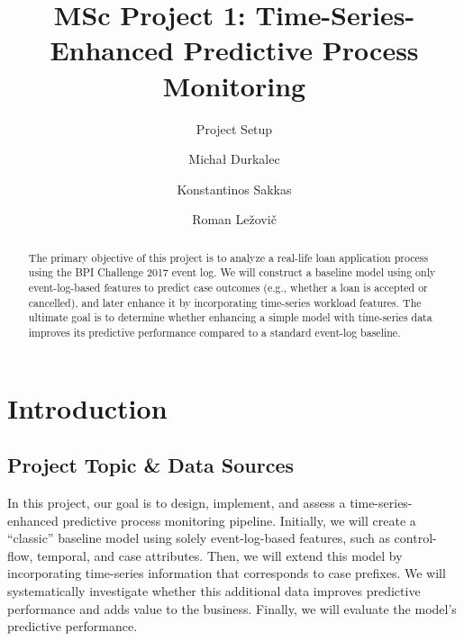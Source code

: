 \documentclass[runningheads]{llncs}
\begin{document}
%
\title{MSc Project 1: Time-Series-Enhanced Predictive Process Monitoring}
\subtitle{Project Setup}
%
%
\author{Michał Durkalec\and
    Konstantinos Sakkas \and
    Roman Ležovič}

%
%
%
\maketitle  %
%
\begin{abstract}
    The primary objective of this project is to analyze a real-life loan application process using the BPI Challenge 2017 event log. We will construct a baseline model using only event-log-based features to predict case outcomes (e.g., whether a loan is accepted or cancelled), and later enhance it by incorporating time-series workload features. The ultimate goal is to determine whether enhancing a simple model with time-series data improves its predictive performance compared to a standard event-log baseline.

\end{abstract}
%
%
%
\section{Introduction}

\subsection{Project Topic \& Data Sources}

In this project, our goal is to design, implement, and assess a time-series-enhanced predictive process monitoring pipeline. Initially, we will create a “classic” baseline model using solely event-log-based features, such as control-flow, temporal, and case attributes. Then, we will extend this model by incorporating time-series information that corresponds to case prefixes. We will systematically investigate whether this additional data improves predictive performance and adds value to the business. Finally, we will evaluate the model’s predictive performance.
\end{document}
